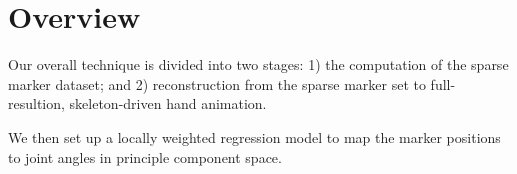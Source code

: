 
\section{Overview}
Our overall technique is divided into two stages: 1) the computation  
of the sparse marker dataset; and 2) reconstruction from the sparse 
marker set to full-resultion, skeleton-driven hand animation.

We then set up a locally 
weighted regression model to map the marker positions to joint angles 
in principle component space. \\
